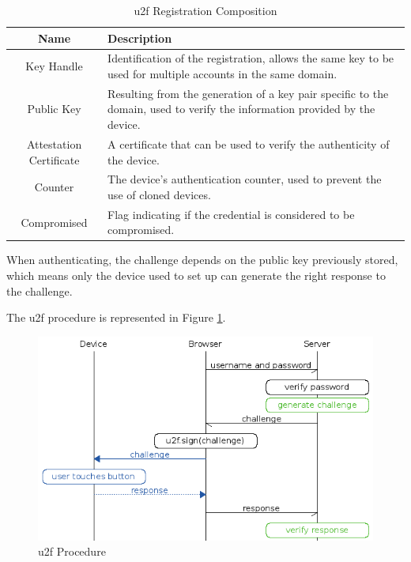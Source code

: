 \begin{table}[ht]
  \begin{tabularx}{\textwidth}{@{}|c| *1{>{\centering\arraybackslash}X}@{}|}
    \hline
    \textbf{Name} & \textbf{Description} \\
    \hline\hline
    Key Handle & Identification of the registration, allows the same key to be used for multiple accounts in the same domain.  \\
    \hline
    Public Key & Resulting from the generation of a key pair specific to the domain, used to verify the information provided by the device. \\
    \hline
    Attestation Certificate & A certificate that can be used to verify the authenticity of the device. \\
    \hline
    Counter & The device's authentication counter, used to prevent the use of cloned devices. \\
    \hline
    Compromised & Flag indicating if the credential is considered to be compromised. \\
    \hline
  \end{tabularx}
  \caption{\acrfull{u2f} Registration Composition}
  \label{tab:u2f}
\end{table}

When authenticating, the challenge depends on the public key previously stored, which means only the device used to set up can generate the right response to the challenge.

The \acrshort{u2f} procedure is represented in Figure \ref{fig:yubi}.

\begin{figure}[ht]
 \centering
 \includegraphics[width=0.9\linewidth]{imgs/yubi.png}
 \caption{\acrshort{u2f} Procedure \cite{yubi}}
 \label{fig:yubi}
\end{figure}


